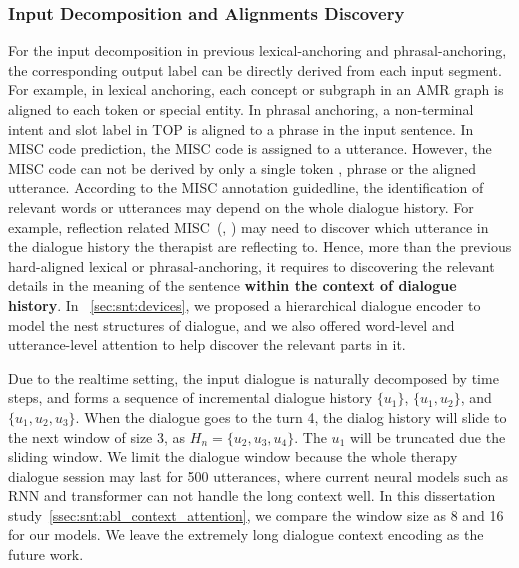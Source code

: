 \subsubsection{Input Decomposition and Alignments Discovery}
\label{sssec:snt:input-decomposition}
For the input decomposition in previous lexical-anchoring and
phrasal-anchoring, the corresponding output label can be directly
derived from each input segment. For example, in lexical anchoring,
each concept or subgraph in an AMR graph is aligned to each token
or special entity. In phrasal anchoring, a non-terminal intent and
slot label in TOP is aligned to a phrase in the input sentence. In
MISC code prediction, the MISC code is assigned to a
utterance. However, the MISC code can not be derived by only a single token
, phrase or the aligned utterance. According to the MISC annotation
guidedline, the identification of relevant words or utterances may
depend on the whole dialogue history. For example, reflection related
MISC~(\RES, \REC) may need to discover which utterance in the dialogue
history the therapist are reflecting to. Hence, more than the previous
hard-aligned lexical or phrasal-anchoring, it requires to discovering
the relevant details in the meaning of the sentence \textbf{within the
  context of dialogue history}. In ~\autoref{sec:snt:devices}, we
proposed a hierarchical dialogue encoder to model the nest structures
of dialogue, and we also offered word-level and utterance-level
attention to help discover the relevant parts in it.

Due to the realtime setting, the input dialogue is naturally
decomposed by time steps, and forms a sequence of incremental dialogue
history $\{u_1\}$, $\{u_1,u_2\}$, and $\{u_1,u_2,u_3\}$.  When the dialogue goes to the turn 4, the dialog history will
slide to the next window of size 3, as $H_{n}=\{u_2,u_3,u_4\}$. The
$u_{1}$ will be truncated due the sliding window. We limit the
dialogue window because the whole therapy dialogue session may last
for 500 utterances, where current neural models such as RNN and
transformer can not handle the long context well.  In this dissertation
study~\autoref{ssec:snt:abl_context_attention}, we compare the window
size as 8 and 16 for our models. We leave the extremely long dialogue
context encoding as the future work.

